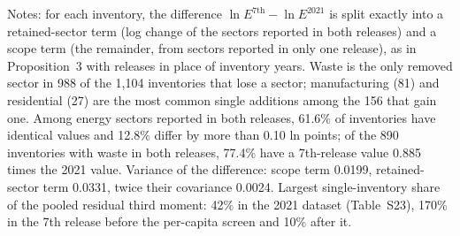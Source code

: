 \begin{table}[width=\linewidth,pos=htbp]
\par\smallskip\begin{minipage}{\linewidth}\footnotesize Notes: for each inventory, the difference $\ln E^{7\mathrm{th}}-\ln E^{2021}$ is split exactly into a retained-sector term (log change of the sectors reported in both releases) and a scope term (the remainder, from sectors reported in only one release), as in Proposition~3 with releases in place of inventory years. Waste is the only removed sector in 988 of the 1,104 inventories that lose a sector; manufacturing (81) and residential (27) are the most common single additions among the 156 that gain one. Among energy sectors reported in both releases, 61.6\% of inventories have identical values and 12.8\% differ by more than 0.10 ln points; of the 890 inventories with waste in both releases, 77.4\% have a 7th-release value 0.885 times the 2021 value. Variance of the difference: scope term 0.0199, retained-sector term 0.0331, twice their covariance 0.0024. Largest single-inventory share of the pooled residual third moment: 42\% in the 2021 dataset (Table~S23), 170\% in the 7th release before the per-capita screen and 10\% after it.\end{minipage}
\end{table}
